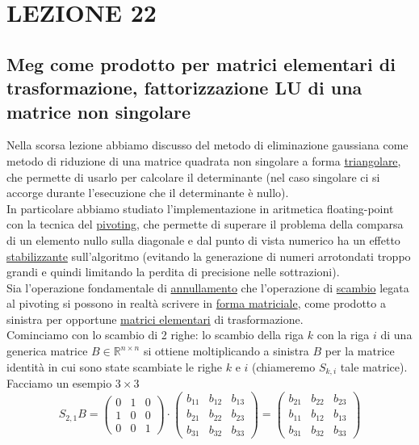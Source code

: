 \documentclass[12pt,a4paper]{article}
\begin{document}
\section*{LEZIONE 22}
\subsection*{Meg come prodotto per matrici elementari di trasformazione, fattorizzazione LU di una matrice non singolare}

Nella scorsa lezione abbiamo discusso del metodo di eliminazione gaussiana come metodo di riduzione di una matrice quadrata non singolare a forma \underline{triangolare}, che permette di usarlo per calcolare il determinante (nel caso singolare ci si accorge durante l'esecuzione che il determinante è nullo).\\In particolare abbiamo studiato l'implementazione in aritmetica floating-point con la tecnica del \underline{pivoting}, che permette di superare il problema della comparsa di un elemento nullo sulla diagonale e dal punto di vista numerico ha un effetto \underline{stabilizzante} sull'algoritmo (evitando la generazione di numeri arrotondati troppo grandi e quindi limitando la perdita di precisione nelle sottrazioni).\\
Sia l'operazione fondamentale di \underline{annullamento} che l'operazione di \underline{scambio} legata al pivoting si possono in realtà scrivere in \underline{forma matriciale}, come prodotto a sinistra per opportune \underline{matrici elementari} di trasformazione.\\Cominciamo con lo scambio di 2 righe: lo scambio della riga $k$ con la riga $i$ di una generica matrice $B\in\mathbb{R}^{n\times n}$ si ottiene moltiplicando a sinistra $B$ per la matrice identità in cui sono state scambiate le righe $k$ e $i$ (chiameremo $S_{k,i}$ tale matrice).\\Facciamo un esempio $3\times 3$
\begin{equation*}
    S_{2,1}B=
    \begin{pmatrix}
        0 & 1 & 0 \\
        1 & 0 & 0 \\
        0 & 0 & 1
    \end{pmatrix} \cdot \begin{pmatrix}
        b_{11} & b_{12} & b_{13} \\
        b_{21} & b_{22} & b_{23} \\
        b_{31} & b_{32} & b_{33}
    \end{pmatrix}=\begin{pmatrix}
        b_{21} & b_{22} & b_{23} \\
        b_{11} & b_{12} & b_{13} \\
        b_{31} & b_{32} & b_{33}
    \end{pmatrix}
\end{equation*}
\end{document}
